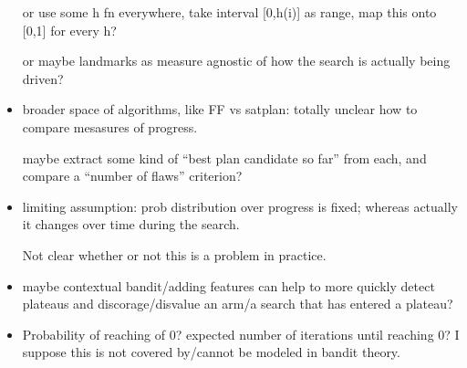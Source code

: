 \begin{itemize}
  or use some h fn everywhere, take interval [0,h(i)] as range, map
  this onto [0,1] for every h?

  or maybe landmarks as measure agnostic of how the search is actually
  being driven? 

\item broader space of algorithms, like FF vs satplan: totally unclear
  how to compare mesasures of progress. 

  maybe extract some kind of ``best plan candidate so far'' from each,
  and compare a ``number of flaws'' criterion?

\item limiting assumption: prob distribution over progress is fixed;
  whereas actually it changes over time during the search. 

  Not clear whether or not this is a problem in practice.

\item maybe contextual bandit/adding features can help to more quickly
  detect plateaus and discorage/disvalue an arm/a search that has
  entered a plateau?

\item Probability of reaching of 0? expected number of iterations
  until reaching 0? I suppose this is not covered by/cannot be modeled
  in bandit theory.

\end{itemize}
